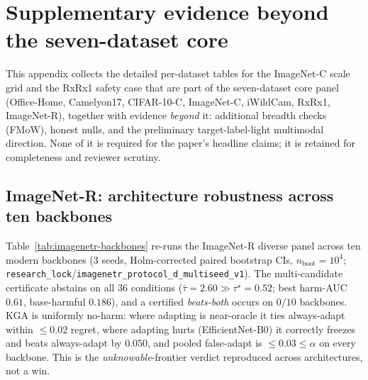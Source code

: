 \documentclass[conference]{IEEEtran}
\theoremstyle{plain}
\theoremstyle{definition}
\begin{document}
\appendix
\section{Supplementary evidence beyond the seven-dataset core}\label{app:supp}
This appendix collects the detailed per-dataset tables for the ImageNet-C scale grid and the RxRx1 safety case that are part of the seven-dataset core panel (Office-Home, Camelyon17, CIFAR-10-C, ImageNet-C, iWildCam, RxRx1, ImageNet-R), together with evidence \emph{beyond} it: additional breadth checks (FMoW), honest nulls, and the preliminary target-label-light multimodal direction. None of it is required for the paper's headline claims; it is retained for completeness and reviewer scrutiny.

\subsection{ImageNet-R: architecture robustness across ten backbones}\label{supp:imagenetr-backbones}
Table~\ref{tab:imagenetr-backbones} re-runs the ImageNet-R diverse panel across ten modern
backbones (3 seeds, Holm-corrected paired bootstrap CIs, $n_{\mathrm{boot}}{=}10^4$;
\texttt{research\_lock}/\texttt{imagenetr\_protocol\_d\_multiseed\_v1}). The multi-candidate
certificate abstains on all $36$ conditions ($\bar\tau{=}2.60\gg\tau^\star{=}0.52$; best
harm-AUC $0.61$, base-harmful $0.186$), and a certified \emph{beats-both} occurs on $0/10$
backbones. \textsc{KGA} is uniformly no-harm: where adapting is near-oracle it ties always-adapt
within $\le0.02$ regret, where adapting hurts (EfficientNet-B0) it correctly freezes and beats
always-adapt by $0.050$, and pooled false-adapt is $\le0.03\le\alpha$ on every backbone. This is
the \emph{unknowable}-frontier verdict reproduced across architectures, not a win.
\end{document}
